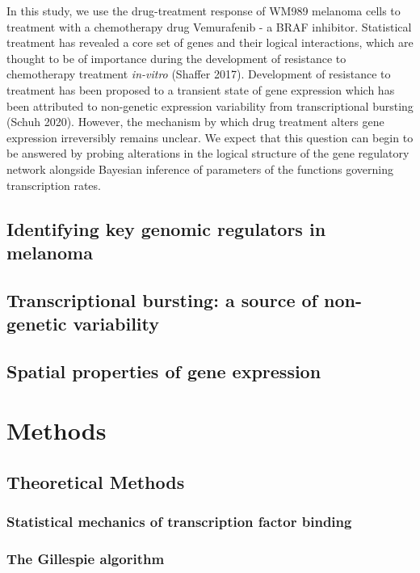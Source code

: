 \documentclass{article}
\begin{document}
In this study, we use the drug-treatment response of WM989 melanoma cells to treatment with a chemotherapy drug Vemurafenib - a BRAF inhibitor. Statistical treatment has revealed a core set of genes and their logical interactions, which are thought to be of importance during the development of resistance to chemotherapy treatment \emph{in-vitro} (Shaffer 2017). Development of resistance to treatment has been proposed to a transient state of gene expression which has been attributed to non-genetic expression variability from transcriptional bursting (Schuh 2020). However, the mechanism by which drug treatment alters gene expression irreversibly remains unclear. We expect that this question can begin to be answered by probing alterations in the logical structure of the gene regulatory network alongside Bayesian inference of parameters of the functions governing transcription rates.

\subsection{Identifying key genomic regulators in melanoma}

\subsection{Transcriptional bursting: a source of non-genetic variability}

\subsection{Spatial properties of gene expression}

\section{Methods}

\subsection{Theoretical Methods}

\subsubsection{Statistical mechanics of transcription factor binding}

\subsubsection{The Gillespie algorithm}
\end{document}
